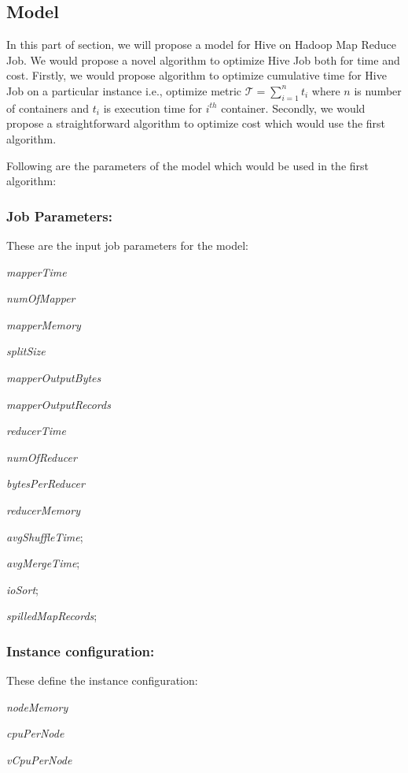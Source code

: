 \subsection{Model}

In this part of section, we will propose a model for Hive on Hadoop Map Reduce Job. We would propose a novel algorithm to optimize Hive Job both for time and cost. Firstly, we would propose algorithm to optimize cumulative time for Hive Job on a particular instance i.e., optimize metric $\mathcal{T} = \sum_{i=1}^{n} t_i$ where $n$ is number of containers and $t_i$ is execution time for $i^{th}$ container. Secondly, we would propose a straightforward algorithm to optimize cost which would use the first algorithm. 

Following are the parameters of the model which would be used in the first algorithm:

\subsubsection{\bf Job Parameters:} \label{subsubsec:job_param}
These are the input job parameters for the model:
\begin{description}
\item \textit{mapperTime} 
\item \textit{numOfMapper}
\item \textit{mapperMemory}
\item \textit{splitSize}
\item \textit{mapperOutputBytes}
\item \textit{mapperOutputRecords}
\item \textit{reducerTime}
\item \textit{numOfReducer}
\item \textit{bytesPerReducer}
\item \textit{reducerMemory}
\item \textit{avgShuffleTime};
\item \textit{avgMergeTime};
\item \textit{ioSort};
\item \textit{spilledMapRecords};
\end{description}

\subsubsection{\bf Instance configuration:} \label{subsubsec:Inst_conf}
These define the instance configuration:
\begin{description}
\item \textit{nodeMemory} 
\item \textit{cpuPerNode}
\item \textit{vCpuPerNode}
\end{description}

